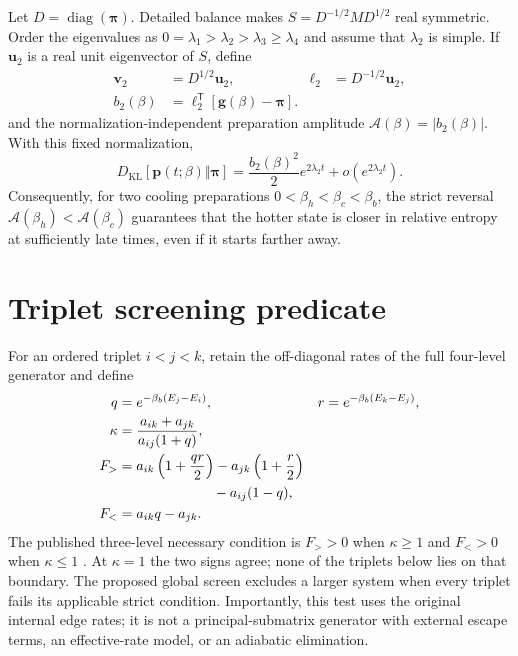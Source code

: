 \documentclass[aps,pre,reprint,superscriptaddress,nofootinbib]{revtex4-2}
\newcommand{\DKL}{D_{\mathrm{KL}}}
\newcommand{\Acal}{\mathcal{A}}
\begin{document}
Let $D=\operatorname{diag}(\bm\pi)$.  Detailed balance makes
$S=D^{-1/2}MD^{1/2}$ real symmetric.  Order the eigenvalues as
$0=\lambda_1>\lambda_2>\lambda_3\geq\lambda_4$ and assume that $\lambda_2$ is
simple.  If $\bm u_2$ is a real unit eigenvector of $S$, define
\begin{equation}
 \begin{aligned}
 \bm v_2&=D^{1/2}\bm u_2,
 &\bm\ell_2&=D^{-1/2}\bm u_2,\\
 b_2(\beta)&=\bm\ell_2^{\mathsf T}[\bm g(\beta)-\bm\pi].&&
 \end{aligned}
 \label{eq:mode}
\end{equation}
and the normalization-independent preparation amplitude
$\Acal(\beta)=|b_2(\beta)|$.  With this fixed normalization,
\begin{equation}
 \DKL[\bm p(t;\beta)\Vert\bm\pi]
 =\frac{b_2(\beta)^2}{2}e^{2\lambda_2 t}
  +o(e^{2\lambda_2 t}).
 \label{eq:klasymp}
\end{equation}
Consequently, for two cooling preparations
$0<\beta_h<\beta_c<\beta_b$, the strict reversal
$\Acal(\beta_h)<\Acal(\beta_c)$ guarantees that the hotter state is closer in
relative entropy at sufficiently late times, even if it starts farther away.

\section{Triplet screening predicate}

For an ordered triplet $i<j<k$, retain the off-diagonal rates of the full
four-level generator and define
\begin{align}
 q&=e^{-\beta_b(E_j-E_i)}, &
 r&=e^{-\beta_b(E_k-E_j)},\nonumber\\
 \kappa&=\frac{a_{ik}+a_{jk}}{a_{ij}(1+q)},\label{eq:kappa}\\
 F_{>}&=a_{ik}\left(1+\frac{qr}{2}\right)
       -a_{jk}\left(1+\frac{r}{2}\right)\nonumber\\
      &\hspace{2.4cm}-a_{ij}(1-q),\label{eq:fhigh}\\
 F_{<}&=a_{ik}q-a_{jk}.\label{eq:flow}
\end{align}
The published three-level necessary condition is $F_{>}>0$ when $\kappa\geq1$
and $F_{<}>0$ when $\kappa\leq1$ \cite{Avitan2026}.  At $\kappa=1$ the two signs
agree; none of the triplets below lies on that boundary.  The proposed global
screen excludes a larger system when every triplet fails its applicable strict
condition.  Importantly, this test uses the original internal edge rates; it is not
a principal-submatrix generator with external escape terms, an effective-rate
model, or an adiabatic elimination.
\end{document}
